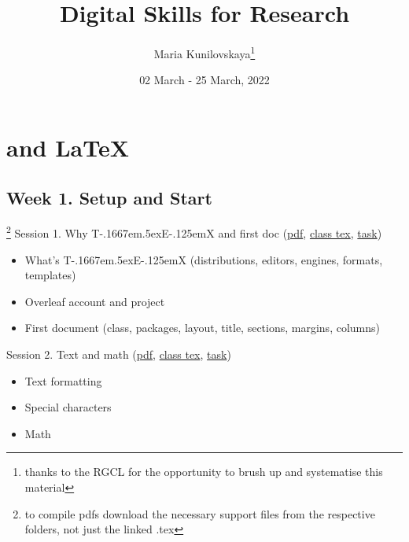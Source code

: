 \documentclass[a4paper,12pt]{article} %
\title{\vspace{-4em} Digital Skills for Research}
\author{Maria Kunilovskaya\thanks{thanks to the RGCL for the opportunity to brush up and systematise this material}}
\date{02 March - 25 March, 2022}
\def\TeX{{\rm T\kern-.1667em\lower.5ex\hbox{E}\kern-.125emX }}
\begin{document}
	
\clearpage\maketitle
\thispagestyle{empty}	
\maketitle

\vspace{-2em}

\section{{\color{red}\TeX and \LaTeX}}

\subsection{Week 1. Setup and Start}\footnote{to compile pdfs download the necessary support files from the respective folders, not just the linked .tex}
	Session 1. Why \TeX and first doc (\href{https://canvas.wlv.ac.uk/courses/33429/files/folder/latex_mendeley_github/w1-3_latex?preview=4622172}{pdf}, \href{https://github.com/kunilovskaya/dskills_workshop/blob/main/w1_latex_basics/session1.tex}{class tex}, \href{https://github.com/kunilovskaya/dskills_workshop/blob/main/w1_latex_basics/task1.tex}{task})
		\begin{itemize}
			\item What's \TeX (distributions, editors, engines, formats, templates)
			\item Overleaf account and project
			\item First document (class, packages, layout, title, sections, margins, columns)
		\end{itemize} 
	Session 2. Text and math (\href{https://canvas.wlv.ac.uk/courses/33429/files/folder/latex_mendeley_github/w1-3_latex?preview=4623463}{pdf}, \href{https://github.com/kunilovskaya/dskills_workshop/blob/main/w1_latex_basics/session1.tex}{class tex}, \href{https://github.com/kunilovskaya/dskills_workshop/blob/main/w1_latex_basics/task2.pdf}{task})
		\begin{itemize}
			\item Text formatting
			\item Special characters
			\item Math
		\end{itemize}
\end{document}
